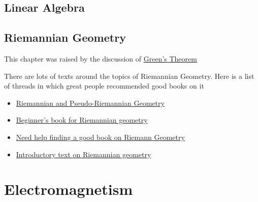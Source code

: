     
    \chapter{Linear Algebra}
    
    \chapter{Riemannian Geometry}
    \label{ch:riemannian-geometry}
    This chapter was raised by the discussion of \hyperlink{green-theorem-proof}{Green's Theorem}

    There are lots of texts around the topics of Riemannian Geometry. Here is a list of threads in which great people
    recommended good books on it

    \begin{itemize}
        \item \href{https://physics.stackexchange.com/a/247415}{Riemannian and Pseudo-Riemannian Geometry}
        \item \href{https://math.stackexchange.com/questions/1546037/beginners-book-for-riemannian-geometry}{Beginner's book for Riemannian geometry}
        \item \href{https://math.stackexchange.com/questions/499945/need-help-finding-a-good-book-on-riemann-geometry}{Need help finding a good book on Riemann Geometry}
        \item \href{https://mathoverflow.net/questions/19505/introductory-text-on-riemannian-geometry}{Introductory text on Riemannian geometry}
    \end{itemize}

    \part{Electromagnetism}

